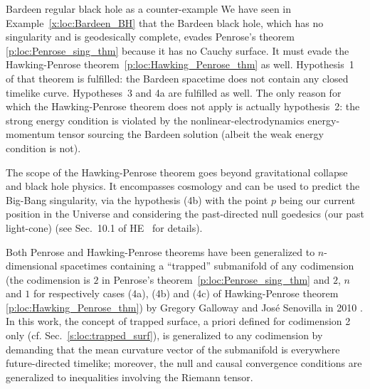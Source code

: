 \begin{texample}{Bardeen regular black hole as a counter-example}{}
We have seen in Example~\ref{x:loc:Bardeen_BH} that the Bardeen
black hole, which has no singularity and is geodesically complete, evades
Penrose's theorem \ref{p:loc:Penrose_sing_thm} because it has no Cauchy surface. It must evade the
Hawking-Penrose theorem~\ref{p:loc:Hawking_Penrose_thm} as well.
Hypothesis~1 of
that theorem
is fulfilled: the Bardeen spacetime does not contain any closed timelike curve.
Hypotheses~3 and 4a are fulfilled as well. The only reason for which the Hawking-Penrose theorem
does not apply is actually hypothesis~2: the strong energy condition is violated
by the nonlinear-electrodynamics energy-momentum tensor sourcing the Bardeen solution
(albeit the weak energy condition is not).
\end{texample}

\begin{remark}
The scope of the Hawking-Penrose theorem goes beyond gravitational collapse and
black hole physics. It encompasses cosmology and can be used to predict the Big-Bang singularity,
via the hypothesis (4b) with the point $p$ being our current position in the Universe and
considering the past-directed null goedesics (our past light-cone) (see Sec.~10.1 of HE~\cite{HawkiE73}
for details).
\end{remark}

\begin{remark}
Both Penrose and Hawking-Penrose theorems have been generalized to $n$-dimensional spacetimes containing a ``trapped'' submanifold
of any codimension (the codimension is $2$ in Penrose's theorem~\ref{p:loc:Penrose_sing_thm}
and $2$, $n$ and $1$ for respectively cases (4a), (4b) and (4c) of Hawking-Penrose theorem \ref{p:loc:Hawking_Penrose_thm}) by Gregory Galloway and
José Senovilla in 2010 \cite{GalloS10}.
In this work,
the concept of trapped surface, a priori defined for
codimension 2 only (cf. Sec.~\ref{s:loc:trapped_surf}), is generalized to any codimension
by demanding that the mean curvature vector of the submanifold is everywhere future-directed timelike; moreover, the null and causal convergence conditions
are generalized to inequalities involving the Riemann tensor.
\end{remark}

